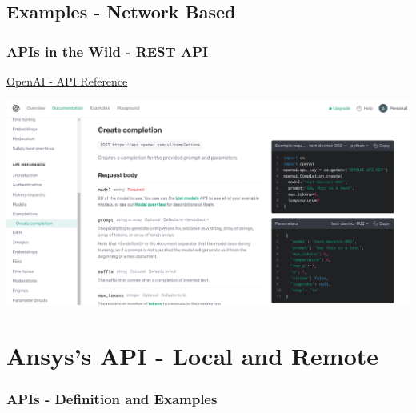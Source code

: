 \documentclass[t]{beamer}
\begin{document}
\subsection{Examples - Network Based}


\begin{frame}
  \frametitle{APIs in the Wild - REST API}
  \vspace{-10pt}

  \href{https://beta.openai.com/docs/api-reference/completions/create?lang=python}{OpenAI - API Reference}

  \centering
  \includegraphics[height=.75\textheight]{./figures/openai-api.png}

\end{frame}




\section{Ansys's API - Local and Remote}

\begin{frame}
  \frametitle{APIs - Definition and Examples}
  \tableofcontents[currentsection]
  \vspace{200pt}  %
\end{frame}
\end{document}
